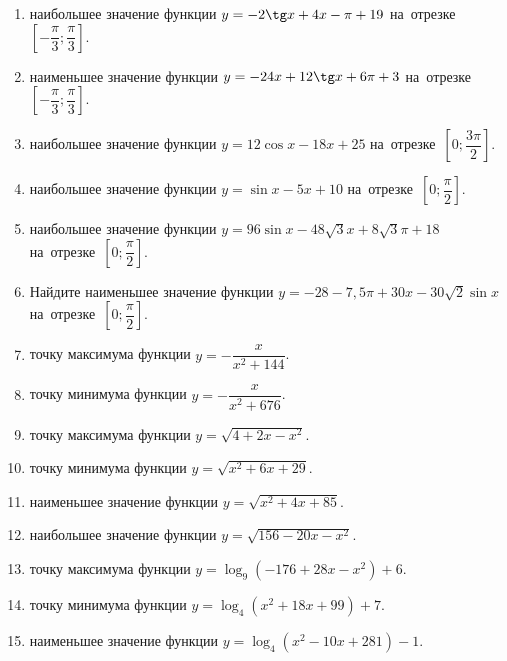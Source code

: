 \documentclass[a4paper,10pt]{article}
\begin{document}
\begin{enumerate}
\item {} наибольшее значение функции $y=-2\tg x +4x-\pi +19$ на~отрезке~$\left[-\dfrac{\pi}{3};\dfrac{\pi}{3}\right]$.

\item {} наименьшее значение функции $y=-24x +12\tg x+6\pi+3$ на~отрезке~$\left[-\dfrac{\pi}{3};\dfrac{\pi}{3}\right]$.

\item {} наибольшее значение функции $y=12\cos x-18x+25$ на~отрезке~$\left[0;\dfrac{3\pi}{2}\right]$.

\item {} наибольшее значение функции $y=\sin x-5x+10$ на~отрезке~$\left[0;\dfrac{\pi}{2}\right]$.

\item {} наибольшее значение функции $y=96\sin x-48\sqrt{3}x+8\sqrt{3}\pi +18$ на~отрезке~$\left[0;\dfrac{\pi}{2}\right]$.

\item Найдите наименьшее значение функции $y=-28-7,5\pi+30x-30\sqrt{2}\sin x$ на~отрезке~$\left[0;\dfrac{\pi}{2}\right]$.

\item {} точку максимума функции $y=-\dfrac{x}{ x^2 +144}$.

\item {} точку минимума функции $y=-\dfrac{x}{ x^2 +676}$.

\item {} точку максимума функции $y=\sqrt{4+2x-x^2}$.

\item {} точку минимума функции $y=\sqrt{x^2+6x+29}$.

\item {} наименьшее значение функции $y=\sqrt{x^2+4x+85}$.

\item {} наибольшее значение функции $y=\sqrt{156-20x-x^2}$.

\item {} точку максимума функции $y=\log_9\left(-176+28x-x^2\right)+6$.

\item {} точку минимума функции $y=\log_4\left(x^2+18x+99\right)+7$.

\item {} наименьшее значение функции $y=\log_4\left(x^2-10x+281\right)-1$.


\end{enumerate}
\end{document}
